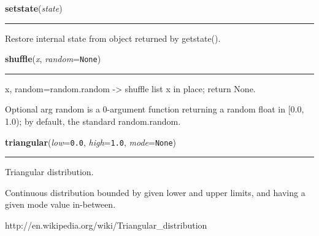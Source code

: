     \label{random:setstate}

    \vspace{0.5ex}

\hspace{.8\funcindent}\begin{boxedminipage}{\funcwidth}

    \raggedright \textbf{setstate}(\textit{state})

    \vspace{-1.5ex}

    \rule{\textwidth}{0.5\fboxrule}
\setlength{\parskip}{2ex}
    Restore internal state from object returned by getstate().

\setlength{\parskip}{1ex}
    \end{boxedminipage}

    \label{random:shuffle}

    \vspace{0.5ex}

\hspace{.8\funcindent}\begin{boxedminipage}{\funcwidth}

    \raggedright \textbf{shuffle}(\textit{x}, \textit{random}={\tt None})

    \vspace{-1.5ex}

    \rule{\textwidth}{0.5\fboxrule}
\setlength{\parskip}{2ex}
    x, random=random.random -{\textgreater} shuffle list x in place; return
    None.

    Optional arg random is a 0-argument function returning a random float 
    in [0.0, 1.0); by default, the standard random.random.

\setlength{\parskip}{1ex}
    \end{boxedminipage}

    \label{random:triangular}

    \vspace{0.5ex}

\hspace{.8\funcindent}\begin{boxedminipage}{\funcwidth}

    \raggedright \textbf{triangular}(\textit{low}={\tt 0.0}, \textit{high}={\tt 1.0}, \textit{mode}={\tt None})

    \vspace{-1.5ex}

    \rule{\textwidth}{0.5\fboxrule}
\setlength{\parskip}{2ex}
    Triangular distribution.

    Continuous distribution bounded by given lower and upper limits, and 
    having a given mode value in-between.

    http://en.wikipedia.org/wiki/Triangular\_distribution

\setlength{\parskip}{1ex}
    \end{boxedminipage}

